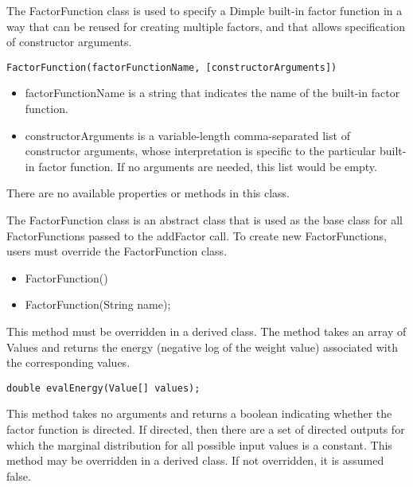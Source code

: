\ifmatlab

The FactorFunction class is used to specify a Dimple built-in factor function in a way that can be reused for creating multiple factors, and that allows specification of constructor arguments.


\begin{lstlisting}
FactorFunction(factorFunctionName, [constructorArguments])
\end{lstlisting}

\begin{itemize}
\item factorFunctionName is a string that indicates the name of the built-in factor function.
\item constructorArguments is a variable-length comma-separated list of constructor arguments, whose interpretation is specific to the particular built-in factor function.  If no arguments are needed, this list would be empty.
\end{itemize}

There are no available properties or methods in this class.

\fi

\ifjava
The FactorFunction class is an abstract class that is used as the base class for all FactorFunctions passed to the addFactor call.  To create new FactorFunctions, users must override the FactorFunction class.


\begin{itemize}
\item FactorFunction()
\item FactorFunction(String name);
\end{itemize}



This method must be overridden in a derived class.  The method takes an array of Values and returns the energy (negative log of the weight value) associated with the corresponding values.

\begin{lstlisting}
double evalEnergy(Value[] values);
\end{lstlisting}


This method takes no arguments and returns a boolean indicating whether the factor function is directed.  If directed, then there are a set of directed outputs for which the marginal distribution for all possible input values is a constant.  This method may be overridden in a derived class.  If not overridden, it is assumed false.

